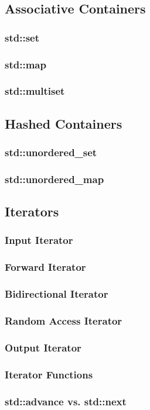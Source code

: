 \subsection{Associative Containers}

\subsubsection{std::set}

\subsubsection{std::map}

\subsubsection{std::multiset}

\subsection{Hashed Containers}

\subsubsection{std::unordered\_set}

\subsubsection{std::unordered\_map}

\subsection{Iterators}

\subsubsection{Input Iterator}

\subsubsection{Forward Iterator}

\subsubsection{Bidirectional Iterator}

\subsubsection{Random Access Iterator}

\subsubsection{Output Iterator}

\subsubsection{Iterator Functions}

\subsubsection{std::advance vs. std::next}